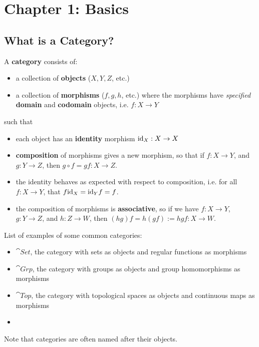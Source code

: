 \section{Chapter 1: Basics}

\subsection{What is a Category?}
\begin{definition}
  A \textbf{category} consists of:
  \begin{itemize}
    \item  a collection of \textbf{objects} ($X, Y, Z$, etc.)
    \item a collection of \textbf{morphisms} ($f, g, h$, etc.) where the morphisms have \textit{specified} \textbf{domain} and \textbf{codomain} objects, i.e. $f : X \to Y$
  \end{itemize}
  such that
  \begin{itemize}
    \item each object has an \textbf{identity} morphism $\mathrm{id}_X : X \to X$
    \item \textbf{composition} of morphisms gives a new morphism, so that if $f : X \to Y$, and $g: Y \to Z$, then $g \circ f = g f : X \to Z$.
    \item the identity behaves as expected with respect to composition, i.e. for all $f : X \to Y$, that $f \mathrm{id}_X = \mathrm{id}_Y f = f$.
    \item the composition of morphisms is \textbf{associative}, so if we have $f : X \to Y$, $g : Y \to Z$, and $h : Z \to W$, then $(hg)f = h(gf) := hgf : X \to W$.
  \end{itemize}
\end{definition}

\begin{example}
  List of examples of some common categories:
  \begin{itemize}
    \item $\cat{Set}$, the category with sets as objects and regular functions as morphisms
    \item $\cat{Grp}$, the category with groups as objects and group homomorphisms as morphisms
    \item $\cat{Top}$, the category with topological spaces as objects and continuous maps as morphisms
    \item
  \end{itemize}
  Note that categories are often named after their objects.
\end{example}

